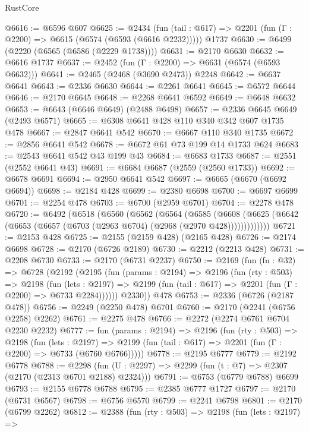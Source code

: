 \begin{lexlean}{RustCore}
\begin{coremodule}
@6616 := @6596 @607
@6625 := @2434
    (fun (tail : @617) => @2201 (fun (Γ : @2200) => @6615 (@6574 (@6593 (@6616 @2232)))))
    @1737
@6630 := @6499 (@2220 (@6565 (@6586 (@2229 @1738))))
@6631 := @2170 @6630
@6632 := @6616 @1737
@6637 := @2452 (fun (Γ : @2200) => @6631 (@6574 (@6593 @6632)))
@6641 := @2465 (@2468 (@3690 @2473)) @2248
@6642 := @6637 @6641
@6643 := @2336 @6630
@6644 := @2261 @6641
@6645 := @6572 @6644
@6646 := @2170 @6645
@6648 := @2268 @6641 @6592
@6649 := @6648 @6632
@6653 := @6643 (@6646 @6649) (@2488 @6498)
@6657 := @2336 @6645 @6649 (@2493 @6571)
@6665 := @6308 @6641 @428 @110 @340 @342 @607 @1735 @478
@6667 := @2847 @6641 @542
@6670 := @6667 @110 @340 @1735
@6672 := @2856 @6641 @542
@6678 := @6672 @61 @73 @199 @14 @1733 @624
@6683 := @2543 @6641 @542 @43 @199 @43
@6684 := @6683 @1733
@6687 := @2551 (@2552 @6641 @43)
@6691 := @6684 @6687 (@2559 (@2560 @1733))
@6692 := @6678 @6691
@6694 := @2950 @6641 @542
@6697 := @6665 (@6670 (@6692 @6694))
@6698 := @2184 @428
@6699 := @2380 @6698
@6700 := @6697 @6699
@6701 := @2254 @478
@6703 := @6700 (@2959 @6701)
@6704 := @2278 @478
@6720 := @6492
    (@6518
      (@6560
        (@6562
          (@6564
            (@6585
              (@6608
                (@6625 (@6642 (@6653 (@6657 (@6703 (@2963 @6704) (@2968 (@2970 @428)))))))))))))
@6721 := @2153 @428
@6725 := @2155 (@2159 @428) (@2165 @428)
@6726 := @2174 @6698
@6728 := @2170 (@6726 @2189)
@6730 := @2212 (@2213 @428)
@6731 := @2208 @6730
@6733 := @2170 (@6731 @2237)
@6750 := @2169
    (fun (fn : @32) =>
    @6728
      (@2192
        (@2195
          (fun (params : @2194) =>
          @2196
            (fun (rty : @503) =>
            @2198
              (fun (lets : @2197) =>
              @2199 (fun (tail : @617) => @2201 (fun (Γ : @2200) => @6733 @2284))))))
        @2330))
    @478
@6753 := @2336 (@6726 (@2187 @478))
@6756 := @2249 (@2250 @478) @6701
@6760 := @2170 (@2241 (@6756 @2258) @2262)
@6761 := @2275 @478
@6766 := @2272 (@2274 @6761 @6704 @2230 @2232)
@6777 := fun (params : @2194) =>
  @2196
    (fun (rty : @503) =>
    @2198
      (fun (lets : @2197) =>
      @2199 (fun (tail : @617) => @2201 (fun (Γ : @2200) => @6733 (@6760 @6766)))))
@6778 := @2195 @6777
@6779 := @2192 @6778
@6788 := @2298 (fun (U : @2297) => @2299 (fun (t : @7) => @2307 (@2170 (@2313 @6701 @2188) @2324)))
@6791 := @6753 (@6779 @6788) @6699
@6793 := @2155 @6778 @6788
@6795 := @2385 @6777 @1727
@6797 := @2170 (@6731 @6567)
@6798 := @6756 @6570
@6799 := @2241 @6798
@6801 := @2170 (@6799 @2262)
@6812 := @2388
    (fun (rty : @503) =>
    @2198
      (fun (lets : @2197) =>

\end{coremodule}
\end{lexlean}
